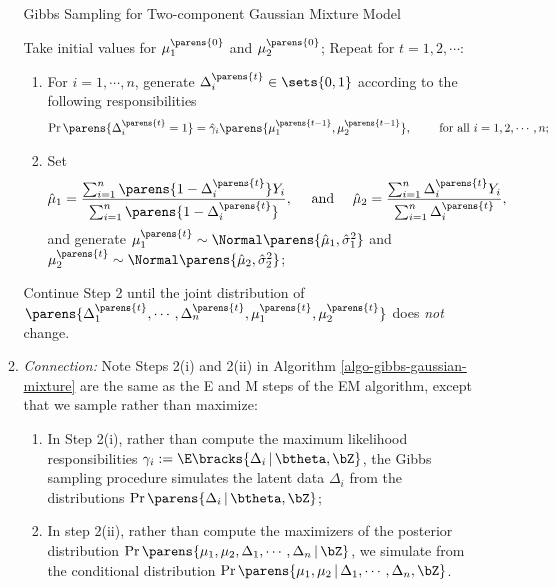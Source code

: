 \documentclass[12pt]{article}
\begin{document}
\begin{enumerate}[label=\textbf{\arabic*.}]
\begin{enumerate}
		\begin{minipage}{\linewidth}
		\begin{algorithm}[H]
			\caption{Gibbs Sampling for Two-component Gaussian Mixture Model}\label{algo-gibbs-gaussian-mixture}
			\begin{algorithmic}[1]
				\STATE Take initial values for $\mu_1^{\parens{0}}$ and $\mu_2^{\parens{0}}$; 
				\STATE Repeat for $t = 1, 2, \cdots$: \label{algo-gibbs-gaussian-mixture-2}
				\begin{enumerate}
					\item \label{algo-gibbs-gaussian-mixture-2-i} For $i = 1, \cdots, n$, generate $\Delta_i^{\parens{t}} \in \sets{0, 1}$ according to the following responsibilities 
					\begin{align*}
						\Pr \parens{\Delta_i^{\parens{t}} = 1} = \hat{\gamma}_i \parens{\mu_1^{\parens{t-1}}, \mu_2^{\parens{t-1}}}, \qquad \text{ for all } i = 1, 2, \cdots, n; 
					\end{align*}
					
					\item \label{algo-gibbs-gaussian-mixture-2-ii} Set 
					\begin{align*}
						\hat{\mu}_1 = \frac{\sum_{i=1}^n \parens{1 - \Delta_i^{\parens{t}}} Y_i}{\sum_{i=1}^n \parens{1 - \Delta_i^{\parens{t}}}}, \quad \text{ and } \quad \hat{\mu}_2 = \frac{\sum_{i=1}^n \Delta_i^{\parens{t}} Y_i}{\sum_{i=1}^n \Delta_i^{\parens{t}}}, 
					\end{align*}
					and generate $\mu_1^{\parens{t}} \sim \Normal \parens{\hat{\mu}_1, \hat{\sigma}_1^2}$ and $\mu_2^{\parens{t}} \sim \Normal \parens{\hat{\mu}_2, \hat{\sigma}_2^2}$; 
				\end{enumerate}
				
				\STATE Continue Step 2 until the joint distribution of $\parens{\Delta_1^{\parens{t}}, \cdots, \Delta_n^{\parens{t}}, \mu_1^{\parens{t}}, \mu_2^{\parens{t}}}$ does \emph{not} change. 
			\end{algorithmic}
		\end{algorithm}
		\end{minipage}
		
		\item \textit{Connection:} Note Steps 2(i) and 2(ii) in Algorithm \ref{algo-gibbs-gaussian-mixture} are the same as the E and M steps of the EM algorithm, except that we sample rather than maximize: 
		\begin{enumerate}
			\item In Step 2(i), rather than compute the maximum likelihood responsibilities $\gamma_i := \E \bracks{\Delta_i \,\vert\, \btheta, \bZ}$, the Gibbs sampling procedure simulates the latent data $\Delta_i$ from the distributions $\Pr \parens{\Delta_i \,\vert\, \btheta, \bZ}$; 
			\item In step 2(ii), rather than compute the maximizers of the posterior distribution $\Pr \parens{\mu_1, \mu_2, \Delta_1, \cdots, \Delta_n \,\vert\, \bZ}$, we simulate from the conditional distribution $\Pr \parens{\mu_1, \mu_2 \,\vert\, \Delta_1, \cdots, \Delta_n, \bZ}$. 
		\end{enumerate}
		

\end{enumerate}
\end{enumerate}
\end{document}
